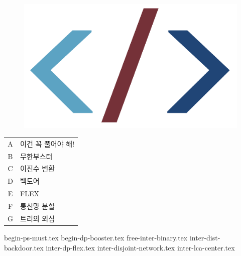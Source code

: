 \documentclass[11pt,a4paper,oneside,korean]{article}
\begin{document}
    
    \begin{titlepage}
        
    \end{titlepage}
    \begin{figure}[h]
        \centering
        \includegraphics[height=0.12\textheight]{./logo-cropped.png}
    \end{figure}
    \skhintro
    {
    
    \begin{table}[h]
    \sffamily\Large
    \renewcommand{\arraystretch}{1.2}
        \begin{tabular}{cl}
        A & 이건 꼭 풀어야 해! \\
        B & 무한부스터 \\
        C & 이진수 변환 \\
        D & 백도어 \\
        E & FLEX \\
        F & 통신망 분할 \\
        G & 트리의 외심 \\
        \end{tabular}
    \end{table}
    }

    \skhintroctd
    
    \newpage
    
    {begin-ps-must.tex}           %
    {begin-dp-booster.tex}        %
    {free-inter-binary.tex}       %
    {inter-dist-backdoor.tex}     %
    {inter-dp-flex.tex}           %
    {inter-disjoint-network.tex}  %
    {inter-lca-center.tex}        %
\end{document}
